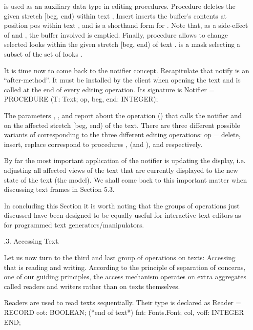  is used as an auxiliary data type in editing
procedures. Procedure  deletes the given stretch [beg, end)
within text , Insert inserts the buffer's contents at position pos
within text , and  is a shorthand form for . Note that, as a side-effect of  and , the
buffer involved is emptied. Finally, procedure  allows to
change selected looks within the given stretch [beg, end) of text
.  is a mask selecting a subset of the set of looks .

It is time now to come back to the notifier concept. Recapitulate that
notify is an ``after-method''. It must be installed by the client when
opening the text and is called at the end of every editing
operation. Its signature is
\begintt
Notifier = PROCEDURE (T: Text; op, beg, end: INTEGER);
\endtt

\noindent The parameters , , and  report about the operation () that
calls the notifier and on the affected stretch [beg, end) of the
text. There are three different possible variants of 
corresponding to the three different editing operations: op =
delete, insert, replace correspond to procedures ,  (and
), and  respectively.

By far the most important application of the notifier is updating the
display, i.e. adjusting all affected views of the text that are
currently displayed to the new state of the text (the model). We shall
come back to this important matter when discussing text frames in
Section 5.3.

In concluding this Section it is worth noting that the groups of
operations just discussed have been designed to be equally useful for
interactive text editors as for programmed text
generators/manipulators.

.3. Accessing Text.

Let us now turn to the third and last group of operations on texts:
Accessing that is reading and writing. According to the principle of
separation of concerns, one of our guiding principles, the access
mechanism operates on extra aggregates called readers and writers
rather than on texts themselves.

Readers are used to read texts sequentially. Their type is declared as
\begintt
Reader = RECORD
  eot: BOOLEAN; (*end of text*)
  fnt: Fonts.Font;
  col, voff: INTEGER
END;
\endtt

